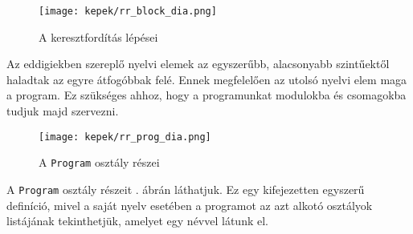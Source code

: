 \begin{figure}[h!]
\centering
\texttt{[image: kepek/rr\_block\_dia.png]}
\caption{A keresztfordítás lépései}
\label{fig:blokk}
\end{figure}


Az eddigiekben szereplő nyelvi elemek az egyszerűbb, alacsonyabb szintűektől haladtak az egyre átfogóbbak felé. Ennek megfelelően az utolsó nyelvi elem maga a program. Ez szükséges ahhoz, hogy a programunkat modulokba és csomagokba tudjuk majd szervezni.

\begin{figure}[h!]
\centering
\texttt{[image: kepek/rr\_prog\_dia.png]}
\caption{A \texttt{Program} osztály részei}
\label{fig:program}
\end{figure}

A \texttt{Program} osztály részeit . ábrán láthatjuk. Ez egy kifejezetten egyszerű definíció, mivel a saját nyelv esetében a programot az azt alkotó osztályok listájának tekinthetjük, amelyet egy névvel látunk el.


